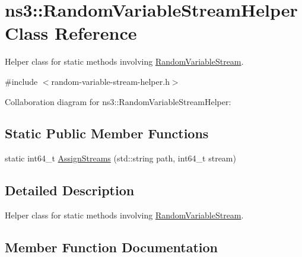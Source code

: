 \hypertarget{classns3_1_1RandomVariableStreamHelper}{}\section{ns3\+:\+:Random\+Variable\+Stream\+Helper Class Reference}
\label{classns3_1_1RandomVariableStreamHelper}


Helper class for static methods involving \hyperlink{classns3_1_1RandomVariableStream}{Random\+Variable\+Stream}.  




{\ttfamily \#include $<$random-\/variable-\/stream-\/helper.\+h$>$}



Collaboration diagram for ns3\+:\+:Random\+Variable\+Stream\+Helper\+:
\subsection*{Static Public Member Functions}
\begin{DoxyCompactItemize}
\item 
static int64\+\_\+t \hyperlink{classns3_1_1RandomVariableStreamHelper_aec2ca1fc9e0321d77f1abd9c56b55cd0}{Assign\+Streams} (std\+::string path, int64\+\_\+t stream)
\end{DoxyCompactItemize}


\subsection{Detailed Description}
Helper class for static methods involving \hyperlink{classns3_1_1RandomVariableStream}{Random\+Variable\+Stream}. 

\subsection{Member Function Documentation}
